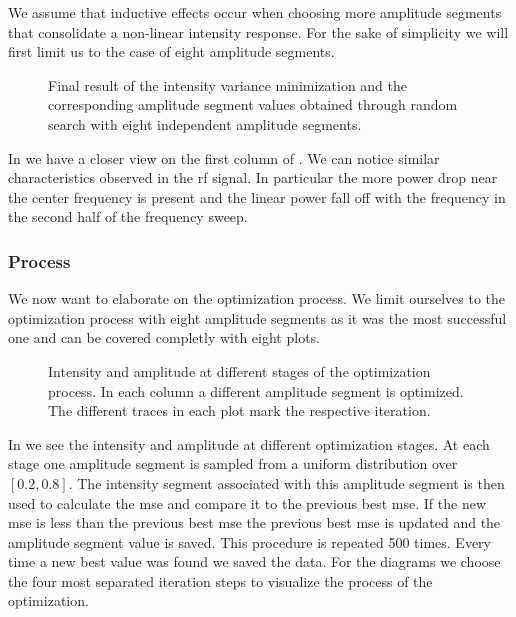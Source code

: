 We assume that inductive effects occur when choosing more amplitude segments
that consolidate a non-linear intensity response. For the sake of simplicity
we will first limit us to the case of eight amplitude segments.
\begin{figure}[htb]
  \centering
  \begin{adjustbox}{width=\textwidth}
  \end{adjustbox}
  \caption{Final result of the intensity variance minimization and the
    corresponding amplitude segment values obtained through random search with
    eight independent amplitude segments.
  }\label{fig:intensity_optimization_intensity_amplitude}
\end{figure}
In  we have a closer
view on the first column of . We
can notice similar characteristics observed in the \gls{rf} signal. In
particular the more power drop near the center frequency is present and the
linear power fall off with the frequency in the second half of the frequency
sweep.

\subsubsection{Process}

We now want to elaborate on the optimization process. We limit ourselves to
the optimization process with eight amplitude segments as it was the most
successful one and can be covered completly with eight plots.
\begin{figure}[htb]
  \centering
  \begin{adjustbox}{width=\textwidth}
  \end{adjustbox}
  \caption{Intensity and amplitude at different stages of the optimization
    process. In each column a different amplitude segment is optimized.
    The different traces in each plot mark the respective iteration.
  }\label{fig:intensity_optimization_process}
\end{figure}
In  we see the intensity and
amplitude at different optimization stages. At each stage one amplitude
segment is sampled from a uniform distribution over $[0.2,0.8]$. The intensity
segment associated with this amplitude segment is then used to calculate
the \gls{mse} and compare it to the previous best \gls{mse}. If the new
\gls{mse} is less than the previous best \gls{mse} the previous best \gls{mse}
is updated and the amplitude segment value is saved. This procedure is
repeated \num{500} times. Every time a new best value was found we saved the
data. For the diagrams we choose the four most separated iteration steps to
visualize the process of the optimization.

